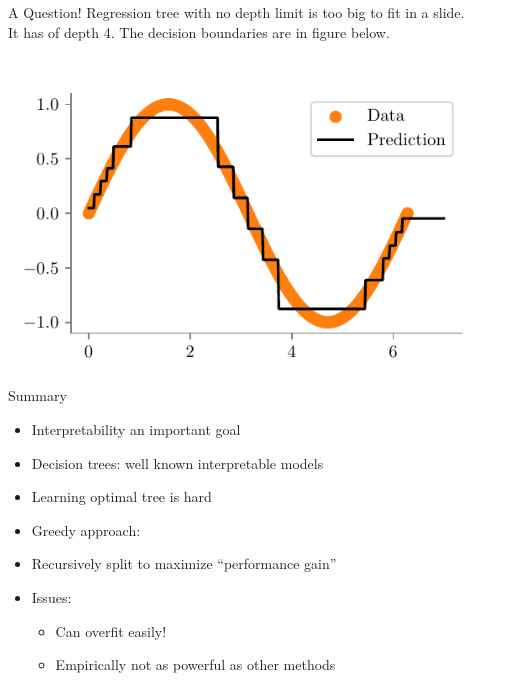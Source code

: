 \documentclass{beamer}
\begin{document}
\begin{frame}{A Question!}
Regression tree with no depth limit is too big to fit in a slide. \\
It has of depth 4. The decision boundaries are in figure below.\\
\begin{center}
\includegraphics{../figures/decision-trees/sine-depth-4.pdf}
\end{center}
\end{frame}

\begin{frame}{Summary}
\begin{itemize}
	\item Interpretability an important goal
\item Decision trees: well known interpretable models
\item  Learning optimal tree is hard
\item  Greedy approach:
\item  Recursively split to maximize “performance gain”
\item  Issues:
\begin{itemize}
	\item Can overfit easily!
	\item  Empirically not as powerful as other methods
\end{itemize}
\end{itemize}

\end{frame}

\end{document}
